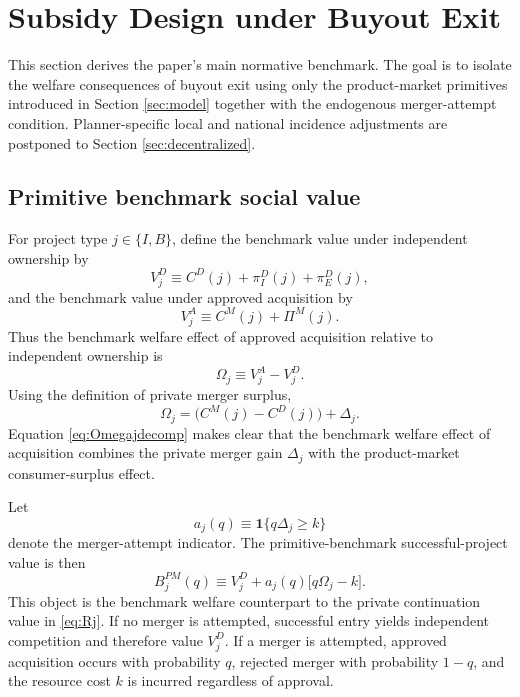 \section{Subsidy Design under Buyout Exit}\label{sec:subsidy}

This section derives the paper's main normative benchmark. The goal is to isolate the welfare consequences of buyout exit using only the product-market primitives introduced in Section \ref{sec:model} together with the endogenous merger-attempt condition. Planner-specific local and national incidence adjustments are postponed to Section \ref{sec:decentralized}.

\subsection{Primitive benchmark social value}

For project type $j\in\{I,B\}$, define the benchmark value under independent ownership by
\begin{equation}\label{eq:VjD}
    V_j^D \equiv C^D(j)+\pi_I^D(j)+\pi_E^D(j),
\end{equation}
and the benchmark value under approved acquisition by
\begin{equation}\label{eq:VjA}
    V_j^A \equiv C^M(j)+\Pi^M(j).
\end{equation}
Thus the benchmark welfare effect of approved acquisition relative to independent ownership is
\begin{equation}\label{eq:Omegaj}
    \Omega_j \equiv V_j^A-V_j^D.
\end{equation}
Using the definition of private merger surplus,
\begin{equation}\label{eq:Omegajdecomp}
    \Omega_j
    =
    \bigl(C^M(j)-C^D(j)\bigr)+\Delta_j.
\end{equation}
Equation \eqref{eq:Omegajdecomp} makes clear that the benchmark welfare effect of acquisition combines the private merger gain $\Delta_j$ with the product-market consumer-surplus effect.

Let
\begin{equation}
    a_j(q)\equiv \mathbf{1}\{q\Delta_j\ge k\}
\end{equation}
denote the merger-attempt indicator. The primitive-benchmark successful-project value is then
\begin{equation}\label{eq:BjPMq}
    B_j^{PM}(q)
    \equiv
    V_j^D+a_j(q)\bigl[q\Omega_j-k\bigr].
\end{equation}
This object is the benchmark welfare counterpart to the private continuation value in \eqref{eq:Rj}. If no merger is attempted, successful entry yields independent competition and therefore value $V_j^D$. If a merger is attempted, approved acquisition occurs with probability $q$, rejected merger with probability $1-q$, and the resource cost $k$ is incurred regardless of approval.

